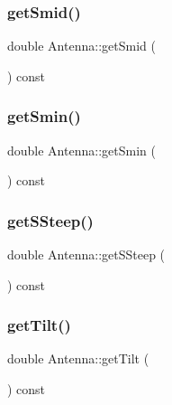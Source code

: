 \subsubsection{\texorpdfstring{get\+Smid()}{getSmid()}}
{\footnotesize\ttfamily double Antenna\+::get\+Smid (\begin{DoxyParamCaption}{ }\end{DoxyParamCaption}) const\hspace{0.3cm}{\ttfamily [private]}}

\mbox{\label{class_antenna_a1955f59f9d3b20ffd8e79f4893bf2e61}} 
\subsubsection{\texorpdfstring{get\+Smin()}{getSmin()}}
{\footnotesize\ttfamily double Antenna\+::get\+Smin (\begin{DoxyParamCaption}{ }\end{DoxyParamCaption}) const\hspace{0.3cm}{\ttfamily [private]}}

\mbox{\label{class_antenna_a096deca0fe8497c0fe53539ae80f2db5}} 
\subsubsection{\texorpdfstring{get\+S\+Steep()}{getSSteep()}}
{\footnotesize\ttfamily double Antenna\+::get\+S\+Steep (\begin{DoxyParamCaption}{ }\end{DoxyParamCaption}) const\hspace{0.3cm}{\ttfamily [private]}}

\mbox{\label{class_antenna_a9feaa77de0a608a7f59eb0854ae746a7}} 
\subsubsection{\texorpdfstring{get\+Tilt()}{getTilt()}}
{\footnotesize\ttfamily double Antenna\+::get\+Tilt (\begin{DoxyParamCaption}{ }\end{DoxyParamCaption}) const\hspace{0.3cm}{\ttfamily [private]}}

